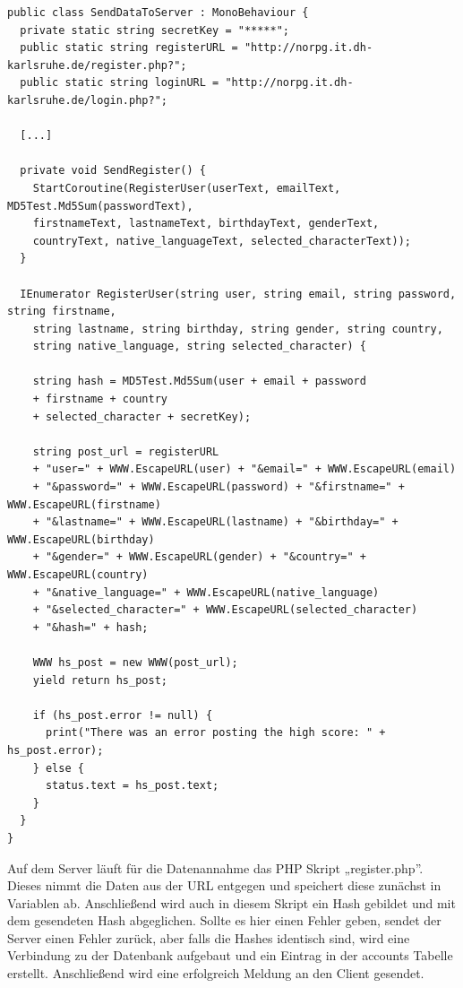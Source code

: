 			\begin{scriptsize}
				\lstset{
					float,
					caption=Skript SendDataToServer.cs, 
					language=[Sharp]C, 
					frame=single,  
					showstringspaces=false, 
					showspaces=false, 
					numbers=left, 
					captionpos=b, 
					belowcaptionskip=4pt,
					basicstyle=\ttfamily
				} 
				\begin{lstlisting}[label=lst:c_SendDataToServer]
public class SendDataToServer : MonoBehaviour {
  private static string secretKey = "*****";
  public static string registerURL = "http://norpg.it.dh-karlsruhe.de/register.php?";
  public static string loginURL = "http://norpg.it.dh-karlsruhe.de/login.php?";

  [...]
	
  private void SendRegister() {
    StartCoroutine(RegisterUser(userText, emailText, MD5Test.Md5Sum(passwordText), 
    firstnameText, lastnameText, birthdayText, genderText, 
    countryText, native_languageText, selected_characterText));
  }
	
  IEnumerator RegisterUser(string user, string email, string password, string firstname, 
    string lastname, string birthday, string gender, string country, 
    string native_language, string selected_character) {
	
    string hash = MD5Test.Md5Sum(user + email + password 
    + firstname + country 
    + selected_character + secretKey);

    string post_url = registerURL
    + "user=" + WWW.EscapeURL(user) + "&email=" + WWW.EscapeURL(email)
    + "&password=" + WWW.EscapeURL(password) + "&firstname=" + WWW.EscapeURL(firstname)
    + "&lastname=" + WWW.EscapeURL(lastname) + "&birthday=" + WWW.EscapeURL(birthday)
    + "&gender=" + WWW.EscapeURL(gender) + "&country=" + WWW.EscapeURL(country)
    + "&native_language=" + WWW.EscapeURL(native_language)
    + "&selected_character=" + WWW.EscapeURL(selected_character)
    + "&hash=" + hash;
    
    WWW hs_post = new WWW(post_url);
    yield return hs_post;

    if (hs_post.error != null) {
      print("There was an error posting the high score: " + hs_post.error);
    } else {
      status.text = hs_post.text;
    }
  }
}
				\end{lstlisting}
			\end{scriptsize}

			Auf dem Server läuft für die Datenannahme das PHP Skript „register.php”. Dieses nimmt die Daten aus der URL entgegen und speichert diese zunächst in Variablen ab. Anschließend wird auch in diesem Skript ein Hash gebildet und mit dem gesendeten Hash abgeglichen. Sollte es hier einen Fehler geben, sendet der Server einen Fehler zurück, aber falls die Hashes identisch sind, wird eine Verbindung zu der Datenbank aufgebaut und ein Eintrag in der accounts Tabelle erstellt. Anschließend wird eine erfolgreich Meldung an den Client gesendet.

